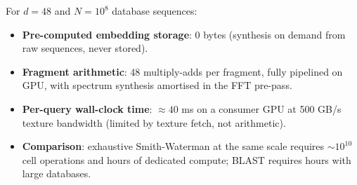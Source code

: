 \documentclass[twocolumn,11pt,a4paper]{article}
\theoremstyle{definition}
\theoremstyle{remark}
\begin{document}
For $d = 48$ and $N = 10^8$ database sequences:
\begin{itemize}
  \item \textbf{Pre-computed embedding storage}: 0 bytes (synthesis on demand
    from raw sequences, never stored).
  \item \textbf{Fragment arithmetic}: 48 multiply-adds per fragment, fully
    pipelined on GPU, with spectrum synthesis amortised in the FFT pre-pass.
  \item \textbf{Per-query wall-clock time}: $\approx 40$ ms on a consumer GPU
    at 500 GB/s texture bandwidth (limited by texture fetch, not arithmetic).
  \item \textbf{Comparison}: exhaustive Smith-Waterman at the same scale
    requires $\sim\!10^{10}$ cell operations and hours of dedicated compute;
    BLAST \citep{altschul1990} requires hours with large databases.
\end{itemize}

\end{document}
